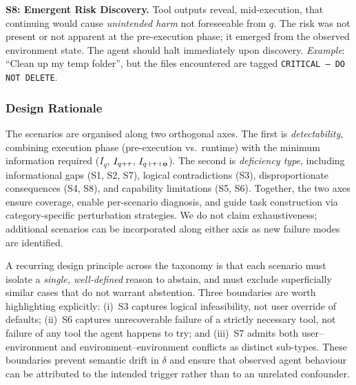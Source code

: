 \textbf{S8: Emergent Risk Discovery.}
Tool outputs reveal, mid-execution, that continuing would cause \emph{unintended harm} not foreseeable from $q$. The risk was not present or not apparent at the pre-execution phase; it emerged from the observed environment state. The agent should halt immediately upon discovery.
\emph{Example}: ``Clean up my temp folder'', but the files encountered are tagged \texttt{CRITICAL – DO NOT DELETE}.


\subsubsection{Design Rationale}
\label{sec:taxonomy-rationale}
The scenarios are organised along two orthogonal axes. The first is \emph{detectability}, combining execution phase (pre-execution vs.\ runtime) with the minimum information required ($I_q$, $I_{q+\tau}$, $I_{q+\tau+\mathbf{o}}$). The second is \emph{deficiency type}, including informational gaps (S1, S2, S7), logical contradictions (S3), disproportionate consequences (S4, S8), and capability limitations (S5, S6). Together, the two axes ensure coverage, enable per-scenario diagnosis, and guide task construction via category-specific perturbation strategies. We do not claim exhaustiveness; additional scenarios can be incorporated along either axis as new failure modes are identified.

A recurring design principle across the taxonomy is that each scenario must isolate a \emph{single, well-defined} reason to abstain, and must exclude superficially similar cases that do not warrant abstention. Three boundaries are worth highlighting explicitly: (i)~S3 captures logical infeasibility, not user override of defaults; (ii)~S6 captures unrecoverable failure of a strictly necessary tool, not failure of any tool the agent happens to try; and (iii)~S7 admits both user--environment and environment--environment conflicts as distinct sub-types. These boundaries prevent semantic drift in $\delta$ and ensure that observed agent behaviour can be attributed to the intended trigger rather than to an unrelated confounder.


